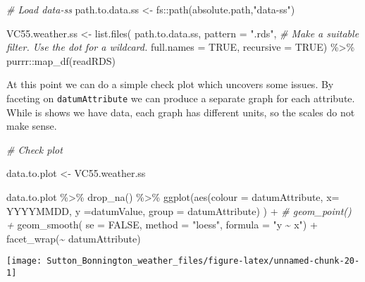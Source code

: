 \documentclass{article}
\newenvironment{Shaded}{\begin{snugshade}}{\end{snugshade}}
\newcommand{\AttributeTok}[1]{\textcolor[rgb]{0.77,0.63,0.00}{#1}}
\newcommand{\CommentTok}[1]{\textcolor[rgb]{0.56,0.35,0.01}{\textit{#1}}}
\newcommand{\ConstantTok}[1]{\textcolor[rgb]{0.00,0.00,0.00}{#1}}
\newcommand{\FunctionTok}[1]{\textcolor[rgb]{0.00,0.00,0.00}{#1}}
\newcommand{\NormalTok}[1]{#1}
\newcommand{\OtherTok}[1]{\textcolor[rgb]{0.56,0.35,0.01}{#1}}
\newcommand{\SpecialCharTok}[1]{\textcolor[rgb]{0.00,0.00,0.00}{#1}}
\newcommand{\StringTok}[1]{\textcolor[rgb]{0.31,0.60,0.02}{#1}}
\begin{document}
\begin{Shaded}
\begin{Highlighting}[]
\CommentTok{\# Load data{-}ss}
\NormalTok{path.to.data.ss }\OtherTok{\textless{}{-}}\NormalTok{ fs}\SpecialCharTok{::}\FunctionTok{path}\NormalTok{(absolute.path,}\StringTok{"data{-}ss"}\NormalTok{)}

\NormalTok{VC55.weather.ss }\OtherTok{\textless{}{-}} \FunctionTok{list.files}\NormalTok{(}
\NormalTok{  path.to.data.ss,}
  \AttributeTok{pattern =} \StringTok{".rds"}\NormalTok{, }\CommentTok{\# Make a suitable filter. Use the dot for a wildcard.}
  \AttributeTok{full.names =} \ConstantTok{TRUE}\NormalTok{,}
  \AttributeTok{recursive =} \ConstantTok{TRUE}\NormalTok{)  }\SpecialCharTok{\%\textgreater{}\%}
\NormalTok{  purrr}\SpecialCharTok{::}\FunctionTok{map\_df}\NormalTok{(readRDS) }
\end{Highlighting}
\end{Shaded}

At this point we can do a simple check plot which uncovers some issues. By faceting on \texttt{datumAttribute} we can produce a separate graph for each attribute. While is shows we have data, each graph has different units, so the scales do not make sense.

\begin{Shaded}
\begin{Highlighting}[]
\CommentTok{\# Check plot}

\NormalTok{data.to.plot }\OtherTok{\textless{}{-}}\NormalTok{ VC55.weather.ss}

\NormalTok{data.to.plot }\SpecialCharTok{\%\textgreater{}\%} \FunctionTok{drop\_na}\NormalTok{() }\SpecialCharTok{\%\textgreater{}\%}
\FunctionTok{ggplot}\NormalTok{(}\FunctionTok{aes}\NormalTok{(}\AttributeTok{colour =}\NormalTok{ datumAttribute, }\AttributeTok{x=}\NormalTok{ YYYYMMDD, }\AttributeTok{y =}\NormalTok{datumValue, }\AttributeTok{group =}\NormalTok{ datumAttribute) ) }\SpecialCharTok{+} 
 \CommentTok{\# geom\_point() +}
  \FunctionTok{geom\_smooth}\NormalTok{( }\AttributeTok{se =} \ConstantTok{FALSE}\NormalTok{, }\AttributeTok{method =} \StringTok{"loess"}\NormalTok{, }\AttributeTok{formula =} \StringTok{"y \textasciitilde{} x"}\NormalTok{) }\SpecialCharTok{+}
  \FunctionTok{facet\_wrap}\NormalTok{(}\SpecialCharTok{\textasciitilde{}}\NormalTok{ datumAttribute)}
\end{Highlighting}
\end{Shaded}

\begin{center}\texttt{[image: Sutton\_Bonnington\_weather\_files/figure-latex/unnamed-chunk-20-1]} \end{center}
\end{document}
